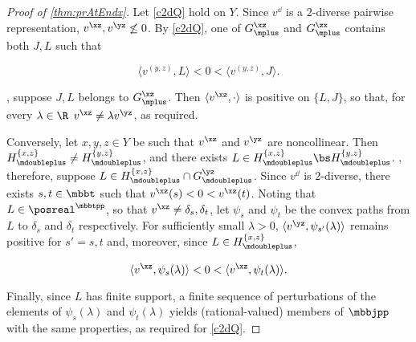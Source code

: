 \label{proofsection:prAtEndx}\begin{proof}[Proof of \autoref{thm:prAtEndx}]\label{proof:prAtEndx}\label {proof-lem-c2dQ} Let \ref {c2dQ} hold on $Y$. Since $v^{\dd }$ is a $2$-diverse pairwise representation, $v^{\xz }, v^{\yz }\not \leq 0$. By \ref {c2dQ}, one of $G_{\mplus }^{\xz }$ and $G_{\mplus }^{\zx }$ contains both $J,L$ such that \begin {linenomath*} \[\langle v^{(y,z)} , L \rangle <0< \langle v^{(y,z)} , J\rangle .\] \end {linenomath*} \Wlog , suppose $J, L $ belongs to $ G_{\mplus }^{\xz }$. Then $\langle v^{\xz },\cdot \rangle $ is positive on $\{L,J\}$, so that, for every $\lambda \in \R $ $v^{\xz } \neq \lambda v^{\yz }$, as required. \par \par Conversely, let $x,y,z \in Y$ be such that $v^{\xz }$ and $v^{\yz }$ are noncollinear. Then $H_{\mdoubleplus }^{\{x,z\}}\neq H_{\mdoubleplus }^{\{y,z\}}$, and there exists $L \in H_{\mdoubleplus }^{\{x,z\}}\bs H_{\mdoubleplus }^{\{y,z\}}$. \Wlog , therefore, suppose $L \in H^{\{x,z\}}_{\mdoubleplus } \cap G^{\yz }_{\mdoubleplus }$. Since $v^{\dd }$ is $2$-diverse, there exists $s,t\in \mbbt $ such that $v^{\xz }(s)<0<v^{\xz }(t)$. Noting that $L \in \posreal ^{\mbbtpp }$, so that $ v^{\xz } \neq \delta _{s},\delta _{t}$, let $\psi _{s}$ and $\psi _{t}$ be the convex paths from $L $ to $\delta _{s}$ and $\delta _{t}$ respectively. For sufficiently small $\lambda > 0$, $ \langle v^{\yz },\psi _{s'} (\lambda ) \rangle $ remains positive for $s'= s, t$ and, moreover, since $L \in H^{\{x,z\}}_{\mdoubleplus }$, \begin {linenomath*} \[\langle v^{\xz }, \psi _{s}(\lambda )\rangle <0< \langle v^{\xz }, \psi _{t}(\lambda ) \rangle . \] \end {linenomath*} Finally, since $L$ has finite support, a finite sequence of perturbations of the elements of $\psi _{s}(\lambda )$ and $\psi _{t}(\lambda )$ yields (rational-valued) members of $\mbbjpp $ with the same properties, as required for \ref {c2dQ}.\end{proof}
